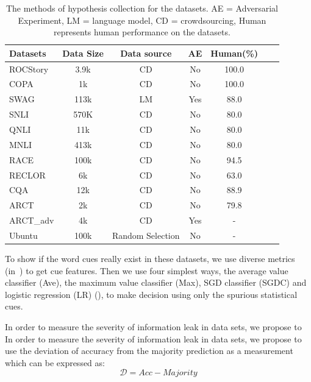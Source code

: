 \begin{table}[h]
\small
\centering
\begin{tabular}{p{7mm}cccccc}\hline
\textbf{Datasets} &Data Size & Data source& AE& Human(\%)\\ \hline                                   
ROCStory & 3.9k         & CD         &No    &100.0  \\
COPA        & 1k           &  CD           &No   &100.0     \\
SWAG       & 113k       &  LM            &Yes  & 88.0\\
SNLI          &  570K     & CD           &No     &80.0\\
QNLI         & 11k         &  CD            &No    &80.0\\
MNLI         & 413k       &  CD            & No   &80.0\\
RACE        & 100k      &  CD            &No    &94.5\\
RECLOR       &  6k          &  CD             &No   &63.0\\
CQA         & 12k        &  CD              &No    &88.9\\
ARCT         & 2k         & CD               &No    &79.8\\
ARCT\_adv& 4k         & CD                &Yes   & -\\
Ubuntu   & 100k      &Random Selection & No  & -  \\
\hline
\end{tabular}
\caption{\label{dataset_intro} The methods of hypothesis collection for
the datasets.  
AE = Adversarial Experiment, LM = language model, CD = crowdsourcing, Human represents 
human performance on the datasets.}
\end{table}
 
To show if the word cues really exist in these datasets, 
we use diverse metrics (in~) to get cue features. 
Then we use four simplest ways, the average value classifier (Ave), 
the maximum value classifier (Max), SGD classifier (SGDC) and 
logistic regression (LR) (), 
to make decision using only the spurious statistical cues. 

In order to measure the severity of information leak in data sets, we propose to 
In order to measure the severity of information leak in data sets, we propose to 
use the deviation of accuracy from the majority prediction as a measurement which can be expressed as:
\begin{equation}
    \mathcal{D} = {Acc} - {Majority}
\end{equation}

